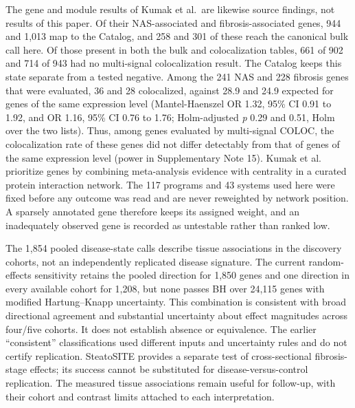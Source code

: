 The gene and module results of Kumak et al.~are likewise source findings, not
results of this paper. Of their NAS-associated and fibrosis-associated genes,
944 and 1,013 map to the Catalog, and 258 and 301 of these reach the canonical
bulk call here. Of those present in both the bulk and colocalization tables, 661
of 902 and 714 of 943 had no multi-signal colocalization result. The Catalog
keeps this state separate from a tested negative. Among the 241 NAS and 228
fibrosis genes that were evaluated, 36 and 28 colocalized, against 28.9 and 24.9
expected for genes of the same expression level (Mantel-Haenszel OR 1.32, 95\% CI
0.91 to 1.92, and OR 1.16, 95\% CI 0.76 to 1.76; Holm-adjusted \emph{p} 0.29 and 0.51,
Holm over the two lists). Thus, among genes evaluated by multi-signal COLOC, the
colocalization rate of these genes did not differ detectably from that of genes
of the same expression level (power in Supplementary Note 15). Kumak et al.
prioritize genes by combining meta-analysis evidence with centrality in a
curated protein interaction network. The 117 programs and 43 systems used here
were fixed before any outcome was read and are never reweighted by network
position. A sparsely annotated gene therefore keeps its assigned weight, and an
inadequately observed gene is recorded as untestable rather than ranked low.

The 1,854 pooled disease-state calls describe tissue associations in the
discovery cohorts, not an independently replicated disease signature. The
current random-effects sensitivity retains the pooled direction for 1,850 genes
and one direction in every available cohort for 1,208, but none passes BH over
24,115 genes with modified Hartung--Knapp uncertainty. This combination is
consistent with broad directional agreement and substantial uncertainty about
effect magnitudes across four/five cohorts. It does not establish absence or
equivalence. The earlier ``consistent'' classifications used different inputs
and uncertainty rules and do not certify replication. SteatoSITE provides a
separate test of cross-sectional fibrosis-stage effects; its success cannot be
substituted for disease-versus-control replication. The measured tissue
associations remain useful for follow-up, with their cohort and contrast limits
attached to each interpretation.

